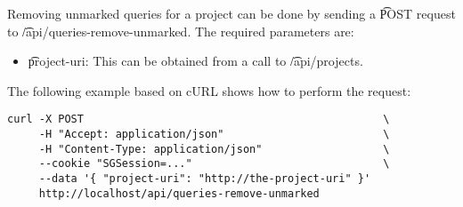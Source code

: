   Removing unmarked queries for a project can be done by sending a
  \t{POST} request to \t{/api/queries-remove-unmarked}.
  The required parameters are:

  \begin{itemize}
    \item{\t{project-uri}: This can be obtained from a call to
      \t{/api/projects}.}
  \end{itemize}

  The following example based on cURL shows how to perform the request:
\begin{siderules}
\begin{verbatim}
curl -X POST                                               \
     -H "Accept: application/json"                         \
     -H "Content-Type: application/json"                   \
     --cookie "SGSession=..."                              \
     --data '{ "project-uri": "http://the-project-uri" }'
     http://localhost/api/queries-remove-unmarked
\end{verbatim}
\end{siderules}
